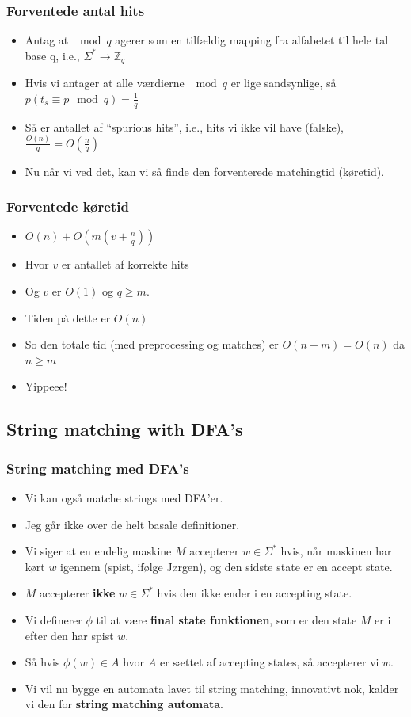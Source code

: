 \documentclass{beamer}
\begin{document}
\begin{frame}[allowframebreaks]
  \frametitle{Forventede antal hits}
  
  \begin{itemize}
  \item Antag at $\mod q$ agerer som en tilfældig mapping fra alfabetet til hele tal base q, i.e., $\Sigma^{*} \rightarrow \mathbb{Z}_{q}$
  \item Hvis vi antager at alle værdierne $\mod q$ er lige sandsynlige, så $p(t_{s} \equiv p \mod q)= \frac{1}{q}$
  \item Så er antallet af ``spurious hits'', i.e., hits vi ikke vil have (falske), $\frac{O(n)}{q} = O(\frac{n}{q})$
  \item Nu når vi ved det, kan vi så finde den forventerede matchingtid (køretid).
  \end{itemize}
\end{frame}

\begin{frame}[allowframebreaks]
  \frametitle{Forventede køretid}
  \begin{itemize}
  \item $O(n) + O(m(v + \frac{n}{q}))$
  \item Hvor $v$ er antallet af korrekte hits
  \item Og $v$ er $O(1)$ og $q \geq m$.
  \item Tiden på dette er $O(n)$
  \item So den totale tid (med preprocessing og matches) er $O(n+m) = O(n)$ da $n \geq m$
  \item Yippeee!
  \end{itemize}
\end{frame}

\subsection{String matching with DFA's}
\label{subsec:label}

\begin{frame}[allowframebreaks]
  \frametitle{String matching med DFA's}
  \begin{itemize}
  \item Vi kan også matche strings med DFA'er.
  \item Jeg går ikke over de helt basale definitioner. 
  \item Vi siger at en endelig maskine $M$ accepterer $w \in \Sigma^{*}$ hvis, når maskinen har kørt $w$ igennem (spist, ifølge Jørgen), og den sidste state er en accept state. 
  \item $M$ accepterer \textbf{ikke} $w \in \Sigma^{*}$ hvis den ikke ender i en accepting state.
  \item Vi definerer $\phi$ til at være \textbf{final state funktionen}, som er den state $M$ er i efter den har spist $w$. 
  \item Så hvis $\phi(w) \in A$ hvor $A$ er sættet af accepting states, så accepterer vi $w$.
  \item Vi vil nu bygge en automata lavet til string matching, innovativt nok, kalder vi den for \textbf{string matching automata}.
  \end{itemize}
\end{frame}
\end{document}

